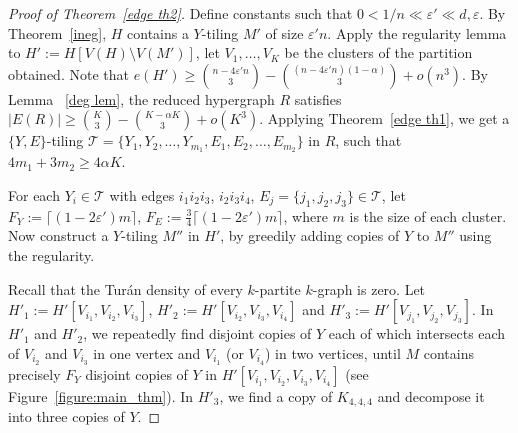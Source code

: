 \documentclass[11pt, reqno]{amsart}    	%
\theoremstyle{definition}
\def\cT{\mathcal T}
\numberwithin{equation}{section}
\begin{document}
	\begin{proof}[Proof of Theorem~\ref{edge th2}]
		Define constants such that $0<1/n\ll \varepsilon'\ll d, \varepsilon$. By Theorem~\ref{ineg}, $ H $ contains  a $Y$-tiling $M'$ of size $ \varepsilon' n $. Apply the regularity lemma to $ H':=H[V(H)\setminus V(M')] $, let $ V_{1},\dots,V_{K} $ be the clusters of the partition obtained. Note that $ e(H')\ge \binom{n-4\varepsilon' n}{3}-\binom{(n-4\varepsilon' n)(1-\alpha)}{3}+o(n^3) $. By Lemma ~\ref{deg lem}, the reduced hypergraph $R$ satisfies $|E(R)|\ge\binom{K}{3}-\binom{K-\alpha K}{3}+o(K^3).$	Applying Theorem~\ref{edge th1}, we get a $\{Y,E\}$-tiling $\cT=\{Y_1,Y_2,\dots,Y_{m_{1}},E_1,E_2,\dots,E_{m_{2}}\} $ in  $ R$, such that $4m_1+3m_2\ge 4\alpha K$.
		
		
		For each  $ Y_i\in  \cT$  with edges $i_1i_2i_3$, $i_2i_3i_4$, $E_j=\{j_1,j_2,j_3\}\in  \cT $, let $F_{Y}:=\lceil (1-2\varepsilon')m\rceil$, $F_{E}:=\frac{3}{4}\lceil (1-2\varepsilon')m\rceil$, where $m$ is the size of each cluster. Now construct a $Y$-tiling $M''$  in $H'$, by greedily adding copies of $Y$ to $M''$ using the regularity.
		
		Recall that the Tur\'an density of every $k$-partite $k$-graph is zero. Let $H'_{1}:=H'[V_{i_1},V_{i_2},V_{i_3}]$, $H'_{2}:=H'[V_{i_2},V_{i_3},V_{i_4}]$ and $H'_{3}:=H'[V_{j_1},V_{j_2},V_{j_3}]$. %
		In $ H'_{1} $ and $ H'_{2} $, %
		we repeatedly find disjoint copies of $Y$ each of which intersects each of $V_{i_2}$ and $V_{i_3}$ in one vertex and $V_{i_1}$ (or $V_{i_4}$) in two vertices, until $M$ contains precisely $F_Y$ disjoint copies of $Y$ in $ H'[V_{i_1},V_{i_2},V_{i_3},V_{i_4}]$ (see Figure~\ref{figure:main_thm}). In $ H'_{3} $, we find a copy of $ K_{4,4,4} $ and decompose it into three copies of $ Y $.
		

\end{proof}
\end{document}

